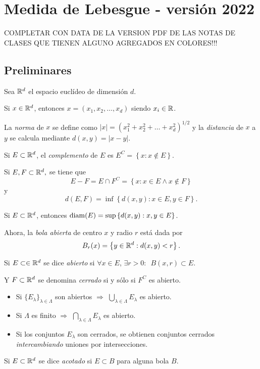 \chapter{Medida de Lebesgue -  versi\'on 2022}

COMPLETAR CON DATA DE LA  VERSION PDF DE LAS NOTAS DE CLASES QUE TIENEN
ALGUNO AGREGADOS EN COLORES!!!


\section{Preliminares}
Sea $\mathbb{R}^d$ el espacio eucl\'ideo de dimensi\'on $d$. 

Si $x \in \mathbb{R}^d$, entonces $x=(x_1,x_2,\ldots,x_d)$ siendo $x_i\in \mathbb{R}$.

La \emph{norma} de $x$ se define como $|x|=\left(x_1^2+x_2^2+\ldots+x_d^2\right)^{1/2}$ y la \emph{distancia} de $x$ a $y$
se calcula mediante $d(x,y)=|x-y|$.

Si $E\subset \mathbb{R}^d$, el \emph{complemento} de $E$ es 
$E^C=\left\{ x:x\notin E\right\}$.

Si $E,F\subset \mathbb{R}^d,$ se tiene que 
$$E-F=E\cap F^C=\left\{x: x\in E \wedge x \notin F\right\}$$ y 
$$d(E,F)=\inf \left\{d(x,y):x\in E, y \in F \right\}.$$

Si $E \subset \mathbb{R}^d$, entonces $\operatorname{diam}(E)=\sup\left\{ d(x,y): x,y \in E \right\}$.

Ahora, la \emph{bola abierta} de centro $x$ y radio $r$ est\'a dada por \[B_r(x)=\left\{y \in \mathbb{R}^d: d(x,y)<r  \right\}.\]

Si $E \subset \in \mathbb{R}^d$ se dice \emph{abierto} si $\forall x \in E$, $\exists r>0:$\, $B(x,r)\subset E$. 

Y $F \subset \mathbb{R}^d$ se denomina \emph{cerrado} si y s\'olo si $F^C$ es abierto.

\begin{itemize}
    \item Si $\{E_{\lambda}\}_{\lambda \in \Lambda}$ son abiertos $\Rightarrow$ $ \bigcup\limits_{\lambda \in \Lambda} E_{\lambda}$ 
    es abierto. 
    \item Si $\Lambda$ es finito $\Rightarrow$ $ \bigcap\limits_{\lambda \in \Lambda} E_{\lambda}$ es abierto.
    \item Si los conjuntos $E_{\lambda}$ son cerrados, se obtienen conjuntos cerrados \emph{intercambiando} uniones por intersecciones.
\end{itemize}

Si $E \subset \mathbb{R}^d$ se dice \emph{acotado} si $E\subset B$ para alguna bola $B$.

